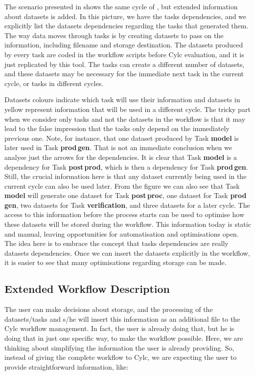 \documentclass[a4paper]{article}
\begin{document}
The scenario presented in  shows the same cycle of , but  extended information about datasets is added.
In this picture, we have the tasks dependencies, and we explicitly list the datasets dependencies regarding the tasks that generated them.
The way data moves through tasks is by creating datasets to pass on the information, including filename and storage destination.
The datasets produced by every task are coded in the workflow scripts before Cylc evaluation, and it is just replicated by this tool. The tasks can create a different number of datasets, and these datasets may be necessary for the immediate next task in the current cycle, or tasks in different cycles.

Datasets colours indicate which task will use their information and datasets in yellow represent information that will be used in a different cycle. The tricky part when we consider only tasks and not the datasets in the workflow is that it may lead to the false impression that the tasks only depend on the immediately previous one. Note, for instance, that one dataset produced by Task \textbf{model} is later used in Task \textbf{prod\,gen}. That is not an immediate conclusion when we analyse just the arrows for the dependencies. It is clear that Task \textbf{model} is a dependency for Task \textbf{post\,prod}, which is then a dependency for Task \textbf{prod\,gen}. Still, the crucial information here is that any dataset currently being used in the current cycle can also be used later. From the figure we can also see that Task \textbf{model} will generate one dataset for Task \textbf{post\,proc}, one dataset for Task \textbf{prod\,gen}, two datasets for Task \textbf{verification}, and three datasets for a later cycle.
The access to this information before the process starts can be used to optimise how these datasets will be stored during the workflow. This information today is static and manual, leaving opportunities for automatisation and optimisations open.
The idea here is to embrace the concept that tasks dependencies are really datasets dependencies. Once we can insert the datasets explicitly in the workflow, it is easier to see that many optimisations regarding storage can be made.

\subsection{Extended Workflow Description}


The user can make decisions about storage, and the processing of the datasets/tasks and s/he will insert this information as an additional file to the Cylc workflow management.
In fact, the user is already doing that, but he is doing that in just one specific way, to make the workflow possible. Here, we are thinking about simplifying the information the user is already providing. So, instead of giving the complete workflow to Cylc, we are expecting the user to provide straightforward information, like:
\end{document}
